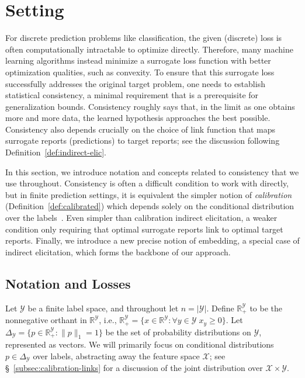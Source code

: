 \documentclass[twoside,11pt]{article}
\newcommand{\reals}{\mathbb{R}}
\newcommand{\simplex}{\Delta_\Y}
\newcommand{\X}{\mathcal{X}}
\newcommand{\Y}{\mathcal{Y}}
\begin{document}
\section{Setting}
\label{sec:setting}

For discrete prediction problems like classification, the given (discrete) loss is often computationally intractable to optimize directly.
Therefore, many machine learning algorithms instead minimize a surrogate loss function with better optimization qualities, such as convexity.
To ensure that this surrogate loss successfully addresses the original target problem, one needs to establish statistical consistency, a minimal requirement that is a prerequisite for generalization bounds.
Consistency roughly says that, in the limit as one obtains more and more data, the learned hypothesis approaches the best possible.
Consistency also depends crucially on the choice of link function that maps surrogate reports (predictions) to target reports; see the discussion following Definition~\ref{def:indirect-elic}.

In this section, we introduce notation and concepts related to consistency that we use throughout.
Consistency is often a difficult condition to work with directly, but in finite prediction settings, it is equivalent the simpler notion of \emph{calibration} (Definition~\ref{def:calibrated}) which depends solely on the conditional distribution over the labels~\citep{bartlett2006convexity,tewari2007consistency,ramaswamy2016convex}.
Even simpler than calibration indirect elicitation, a weaker condition only requiring that optimal surrogate reports link to optimal target reports.
Finally, we introduce a new precise notion of embedding, a special case of indirect elicitation, which forms the backbone of our approach.


\subsection{Notation and Losses}
\label{sec:notation-losses}

Let $\Y$ be a finite label space, and throughout let $n=|\Y|$.
Define $\reals^\Y_+$ to be the nonnegative orthant in $\reals^\Y$, i.e., $\reals^\Y_+ = \{x \in \reals^\Y : \forall y\in\Y\; x_y \geq 0 \}$.
Let $\simplex = \{p\in\reals^{\Y}_+ : \|p\|_1 = 1\}$ be the set of probability distributions on $\Y$, represented as vectors.
We will primarily focus on conditional distributions $p\in\simplex$ over labels, abstracting away the feature space $\X$; see \S~\ref{subsec:calibration-links} for a discussion of the joint distribution over $\X\times\Y$.
\end{document}
